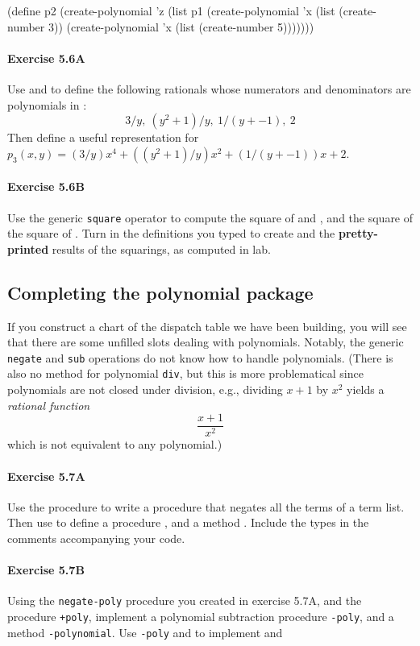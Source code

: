 \beginlisp
(define p2
  (create-polynomial
   'z
   (list
    p1
    (create-polynomial 'x (list (create-number 3))
    (create-polynomial 'x (list (create-number 5)))))))
\endlisp

\paragraph{Exercise 5.6A}
Use  and  to
define the following rationals whose numerators and denominators are
polynomials in :
\[3/y,\ (y^{2}+1)/y,\ 1/(y + -1),\ 2\]
Then define a useful representation for $p_3(x,y)=(3/y)x^4 +
((y^{2}+1)/y)x^2 + (1/(y + -1))x + 2$.

\paragraph{Exercise 5.6B}
Use the generic {\tt square} operator to compute the square of 
and , and the square of the square of .  Turn in the
definitions you typed to create  and the {\bf pretty-printed}
results of the squarings, as computed in lab.


\subsection{Completing the polynomial package}

If you construct a chart of the dispatch table we have been building, you
will see that there are some unfilled slots dealing with polynomials.
Notably, the generic {\tt negate} and {\tt sub} operations do not know how
to handle polynomials.  (There is also no method for polynomial {\tt div},
but this is more problematical since polynomials are not closed under
division, e.g., dividing $x+1$ by $x^2$ yields a {\em rational function}
\[\frac{x+1}{x^2}\] which is not equivalent to any polynomial.)

\paragraph{Exercise 5.7A} Use the procedure  to
write a procedure  that negates all the terms of a term
list.  Then use  to define a procedure
, and a method .  Include the
types in the comments accompanying your code.

\paragraph{Exercise 5.7B}
Using the {\tt negate-poly} procedure you created in exercise 5.7A, and the
procedure {\tt +poly}, implement a polynomial subtraction procedure {\tt -poly},
and a method {\tt -polynomial}.  Use {\tt -poly} and  to
implement  and 

